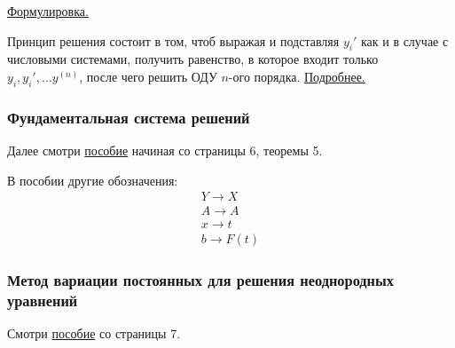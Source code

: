 \href{http://twt.mpei.ac.ru/math/ode/ODEsys/ODEsysup_08050000.html}{Формулировка.}

Принцип решения состоит в том, чтоб выражая и подставляя $y_i'$ как и в случае с числовыми системами, получить равенство, в которое входит только $y_i, y_i', \ldots y^{(n)}$, после чего решить ОДУ $n$-ого порядка. 
\href{https://math-it.petrsu.ru/users/semenova/DIFF_UR/Lections/Diff_UR_8.pdf}{Подробнее.} 

\subsubsection{Фундаментальная система решений}






Далее смотри \href{https://math-it.petrsu.ru/users/semenova/DIFF_UR/Lections/Diff_UR_8.pdf}{пособие} начиная со страницы 6, теоремы 5.

В пособии другие обозначения: 
\begin{align*}
	Y \rightarrow X\\
	A \rightarrow A\\
	x \rightarrow t\\
	b \rightarrow F(t)
\end{align*}

\subsubsection{Метод вариации постоянных для решения неоднородных уравнений}
Смотри \href{https://math-it.petrsu.ru/users/semenova/DIFF_UR/Lections/Diff_UR_8.pdf}{пособие} со страницы 7.
